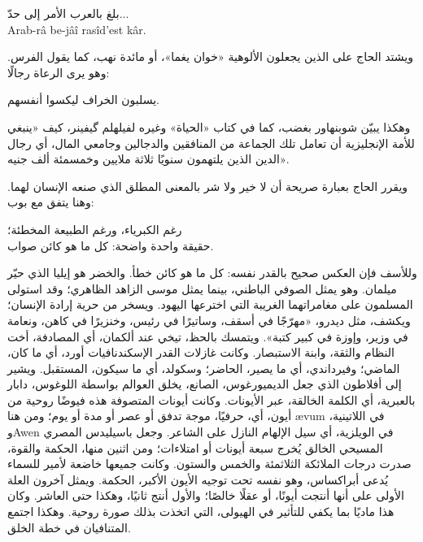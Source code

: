 \begin{SourceQuotation}
بلغ بالعرب الأمر إلى حدّ...\\
\textenglish{Arab-râ be-jâî rasîd’est kâr}.
\end{SourceQuotation}

ويشتد الحاج على الذين يجعلون الألوهية «خوان يغما»، أو مائدة نهب، كما يقول الفرس. وهو يرى الرعاة رجالًا:

\begin{SourceQuotation}
يسلبون الخراف ليكسوا أنفسهم.
\end{SourceQuotation}

وهكذا يبيّن شوبنهاور بغضب، كما في كتاب «الحياة» وغيره لفيلهلم گيفينر، كيف «ينبغي للأمة الإنجليزية أن تعامل تلك الجماعة من المنافقين والدجالين وجامعي المال، أي رجال الدين الذين يلتهمون سنويًا ثلاثة ملايين وخمسمئة ألف جنيه».

ويقرر الحاج بعبارة صريحة أن لا خير ولا شر بالمعنى المطلق الذي صنعه الإنسان لهما. وهنا يتفق مع بوب:

\begin{SourceQuotation}
رغم الكبرياء، ورغم الطبيعة المخطئة؛\\
حقيقة واحدة واضحة: كل ما هو كائن صواب.
\end{SourceQuotation}

وللأسف فإن العكس صحيح بالقدر نفسه: كل ما هو كائن خطأ. والخضر هو إيليا الذي حيّر ميلمان. وهو يمثل الصوفي الباطني، بينما يمثل موسى الزاهد الظاهري؛ وقد استولى المسلمون على مغامراتهما الغريبة التي اخترعها اليهود. ويسخر من حرية إرادة الإنسان؛ ويكشف، مثل ديدرو، «مهرّجًا في أسقف، وساتيرًا في رئيس، وخنزيرًا في كاهن، ونعامة في وزير، وإوزة في كبير كتبة». ويتمسك بالحظ، تيخي عند ألكمان، أي المصادفة، أخت النظام والثقة، وابنة الاستبصار. وكانت غازلات القدر الإسكندنافيات أورد، أي ما كان، الماضي؛ وفيرداندي، أي ما يصير، الحاضر؛ وسكولد، أي ما سيكون، المستقبل. ويشير إلى أفلاطون الذي جعل الديميورغوس، الصانع، يخلق العوالم بواسطة اللوغوس، دابار بالعبرية، أي الكلمة الخالقة، عبر الأيونات. وكانت أيونات المتصوفة هذه فيوضًا روحية من أيون، أي، حرفيًا، موجة تدفق أو عصر أو مدة أو يوم؛ ومن هنا \textenglish{ævum} في اللاتينية، و\textenglish{Awen} في الويلزية، أي سيل الإلهام النازل على الشاعر. وجعل باسيليدس المصري المسيحي الخالق يُخرج سبعة أيونات أو امتلاءات؛ ومن اثنين منها، الحكمة والقوة، صدرت درجات الملائكة الثلاثمئة والخمس والستون. وكانت جميعها خاضعة لأمير للسماء يُدعى أبراكساس، وهو نفسه تحت توجيه الأيون الأكبر، الحكمة. ويمثل آخرون العلة الأولى على أنها أنتجت أيونًا، أو عقلًا خالصًا؛ والأول أنتج ثانيًا، وهكذا حتى العاشر. وكان هذا ماديًا بما يكفي للتأثير في الهيولى، التي اتخذت بذلك صورة روحية. وهكذا اجتمع المتنافيان في خطة الخلق.

